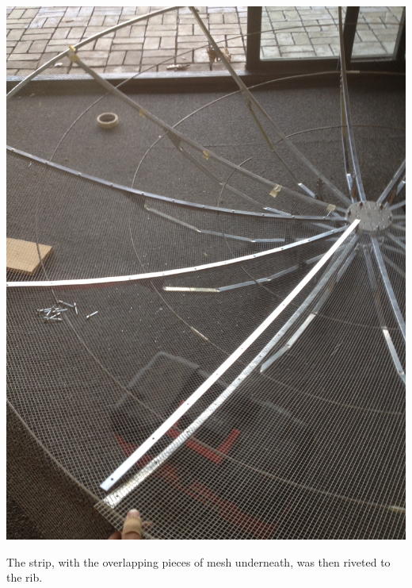 \documentclass[11pt]{article} %
\begin{document}
\begin{center}
\includegraphics[scale=0.12]{dish/14.jpeg}
\end{center}

The strip, with the overlapping pieces of mesh underneath, was then riveted to the rib.
\end{document}
